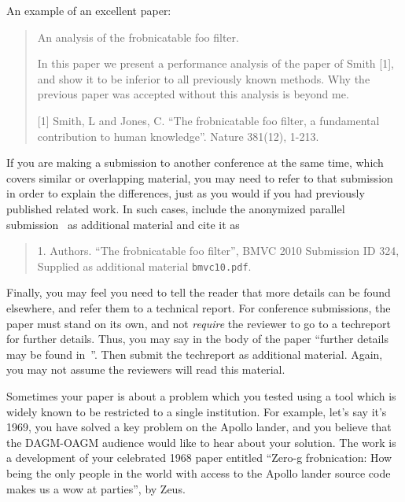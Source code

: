 \documentclass[runningheads]{llncs}
\begin{document}
   
An example of an excellent paper:   
   
\begin{quote}
\begin{center}
     An analysis of the frobnicatable foo filter. 
\end{center}
\vspace{0.5em}
   
   In this paper we present a performance analysis of the
   paper of Smith [1], and show it to be inferior to
   all previously known methods.  Why the previous paper
   was accepted without this analysis is beyond me.
   
   [1] Smith, L and Jones, C. ``The frobnicatable foo
   filter, a fundamental contribution to human knowledge''.
   Nature 381(12), 1-213.
\end{quote}
   
If you are making a submission to another conference at the same time,
which covers similar or overlapping material, you may need to refer to that
submission in order to explain the differences, just as you would if you
had previously published related work.  In such cases, include the
anonymized parallel submission~\cite{Authors10} as additional material and
cite it as
\begin{quote}
1. Authors. ``The frobnicatable foo filter'', BMVC 2010 Submission ID 324,
Supplied as additional material {\tt bmvc10.pdf}.
\end{quote}

Finally, you may feel you need to tell the reader that more details can be
found elsewhere, and refer them to a technical report.  For conference
submissions, the paper must stand on its own, and not {\em require} the
reviewer to go to a techreport for further details.  Thus, you may say in
the body of the paper ``further details may be found
in~\cite{Authors10b}''.  Then submit the techreport as additional material.
Again, you may not assume the reviewers will read this material.

Sometimes your paper is about a problem which you tested using a tool which
is widely known to be restricted to a single institution.  For example,
let's say it's 1969, you have solved a key problem on the Apollo lander,
and you believe that the DAGM-OAGM audience would like to hear about your
solution.  The work is a development of your celebrated 1968 paper entitled
``Zero-g frobnication: How being the only people in the world with access to
the Apollo lander source code makes us a wow at parties'', by Zeus.
\end{document}
